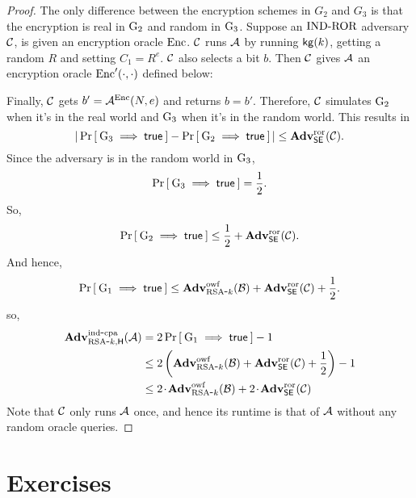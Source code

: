 \begin{proof}
The only difference between the encryption schemes in $G_2$ and $G_3$ is that the encryption is real in $\G_2$ and random in $\G_3$. Suppose an $\INDROR$ adversary $\advC$, is given an encryption oracle $\EncOracle$. $\advC$ runs $\advA$ by running $\kg(k)$, getting a random $R$ and setting $C_1 = R^e$. $\advC$ also selects a bit $b$. Then $\advC$ gives $\advA$ an encryption oracle $\EncOracle'(\cdot, \cdot)$ defined below:
\begin{center}
\end{center}
Finally, $\advC$ gets $b' = \advA^{\EncOracle}(N, e)$ and returns $b = b'$. Therefore, $\advC$  simulates $\G_2$ when it's in the real world and $\G_3$ when it's in the random world. This results in%
\[
|\Prob{\G_3 \implies \true} - \Prob{\G_2\implies \true}| \leq \AdvROR{\SEscheme}{\advC}.
\]
Since the adversary is in the random world in $\G_3$,
\[
\Prob{\G_3 \implies \true} = \frac{1}{2}.
\]
So,
\[
\Prob{\G_2 \implies \true} \le \frac{1}{2} + \AdvROR{\SEscheme}{\advC}.
\]
And hence,
\[
\Prob{\G_1 \implies \true} \le \AdvOWF{\RSAk}{\advB} +\AdvROR{\SEscheme}{\advC} +  \frac{1}{2}.
\]
so,
\begin{align*}
\AdvINDCPA{\RSAk,\Horacle}{\advA} &= 2\Prob{\G_1\implies \true}  - 1\\
							 &\le 2\left(\AdvOWF{\RSAk}{\advB} +\AdvROR{\SEscheme}{\advC} +  \frac{1}{2}\right) - 1\\
							 &\le 2\cdotsm\AdvOWF{\RSAk}{\advB} +2\cdotsm\AdvROR{\SEscheme}{\advC}
\end{align*}
Note that $\advC$ only runs $\advA$ once, and hence its runtime is that of $\advA$ without any random oracle queries.
\end{proof}


\section*{Exercises}

